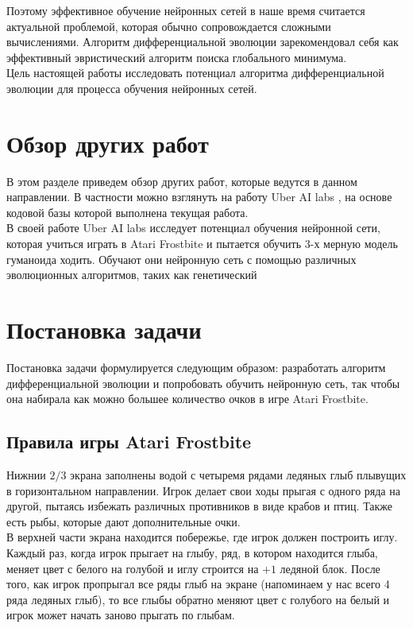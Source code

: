\documentclass[12pt]{article}
\begin{document}
    Поэтому эффективное обучение нейронных сетей в наше время считается актуальной проблемой, которая обычно сопровождается сложными вычислениями. Алгоритм дифференциальной эволюции зарекомендовал себя как эффективный эвристический алгоритм поиска глобального минимума. \\
    
    Цель настоящей работы исследовать потенциал алгоритма дифференциальной эволюции для процесса обучения нейронных сетей. 

\section{Обзор других работ}
    В этом разделе приведем обзор других работ, которые ведутся в данном направлении. В частности можно взглянуть на работу Uber AI labs \cite{uber}, на основе кодовой базы которой выполнена текущая работа. \\

    В своей работе Uber AI labs исследует потенциал обучения нейронной сети, которая учиться играть в Atari Frostbite и пытается обучить 3-х мерную модель гуманоида ходить. Обучают они нейронную сеть с помощью различных эволюционных алгоритмов, таких как генетический 

\section{Постановка задачи}
    Постановка задачи формулируется следующим образом: разработать алгоритм дифференциальной эволюции и попробовать обучить нейронную сеть, так чтобы она набирала как можно большее количество очков в игре Atari Frostbite.

    \subsection{Правила игры Atari Frostbite}
    Нижнии $2/3$ экрана заполнены водой с четыремя рядами ледяных глыб плывущих в горизонтальном направлении. Игрок делает свои ходы прыгая с одного ряда на другой, пытаясь избежать различных противников в виде крабов и птиц. Также есть рыбы, которые дают дополнительные очки. \\

    В верхней части экрана находится побережье, где игрок должен построить иглу. Каждый раз, когда игрок прыгает на глыбу, ряд, в котором находится глыба, меняет цвет с белого на голубой и иглу строится на $+1$ ледяной блок. После того, как игрок пропрыгал все ряды глыб на экране (напоминаем у нас всего 4 ряда ледяных глыб), то все глыбы обратно меняют цвет с голубого на белый и игрок может начать заново прыгать по глыбам. \\
\end{document}
